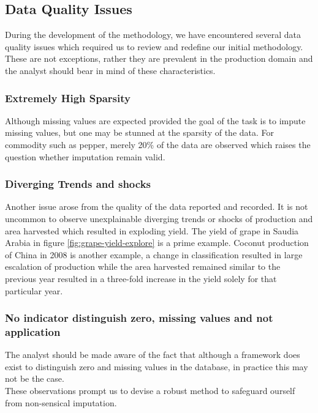 \documentclass[nojss]{jss}\usepackage[]{graphicx}\usepackage[]{color}
\begin{document}
\FloatBarrier
\subsection{Data Quality Issues}
During the development of the methodology, we have encountered several
data quality issues which required us to review and redefine our
initial methodology. These are not exceptions, rather they are
prevalent in the production domain and the analyst should bear in mind
of these characteristics.


\subsubsection{Extremely High Sparsity}
Although missing values are expected provided the goal of the task is
to impute missing values, but one may be stunned at the sparsity of
the data. For commodity such as pepper, merely 20\% of the data are
observed which raises the question whether imputation remain valid.

\subsubsection{Diverging Trends and shocks}
Another issue arose from the quality of the data reported and
recorded. It is not uncommon to observe unexplainable diverging trends
or shocks of production and area harvested which resulted in exploding
yield. The yield of grape in Saudia Arabia in figure
\ref{fig:grape-yield-explore} is a prime example. Coconut production
of China in 2008 is another example, a change in classification
resulted in large escalation of production while the area harvested
remained similar to the previous year resulted in a three-fold
increase in the yield solely for that particular year.\\

\subsubsection{No indicator distinguish zero, missing values and not application}
The analyst should be made aware of the fact that although a framework
does exist to distinguish zero and missing values in the database, in
practice this may not be the case.\\


These observations prompt us to devise a robust method to safeguard
ourself from non-sensical imputation.\\
\end{document}
